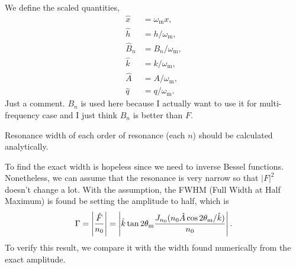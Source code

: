 We define the scaled quantities,
\begin{align}
      \hat x &= \omega_{\mathrm{m}} x, \\
      \hat h &= h/\omega_{\mathrm{m}}, \\
      \hat B_n &= B_n/\omega_{\mathrm{m}}, \\
      \hat k &= k/\omega_{\mathrm{m}}, \\
      \hat A &= A/\omega_{\mathrm{m}}, \\
      \hat q &= q/\omega_{\mathrm{m}} .
\end{align}
Just a comment. $B_n$ is used here because I actually want to use it for multi-frequency case and I just think $B_n$ is better than $F$.

















Resonance width of each order of resonance (each $n$) should be calculated analytically.


To find the exact width is hopeless since we need to inverse Bessel functions. Nonetheless, we can assume that the resonance is very narrow so that $\left\lvert F \right\rvert^2$ doesn't change a lot. With the assumption, the FWHM (Full Width at Half Maximum) is found be setting the amplitude to half, which is
\begin{equation}
   \Gamma = \left\lvert \frac{\hat F}{n_0} \right\rvert = \left\lvert \hat k \tan 2\theta_\mathrm m \frac{ J_{n_0}( n_0 \hat A \cos 2\theta_\mathrm m/\hat k )}{n_0} \right\rvert .
\end{equation}
To verify this result, we compare it with the width found numerically from the exact amplitude.

